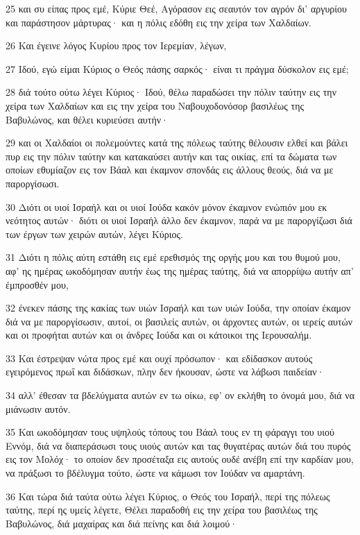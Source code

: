 \par 25 και συ είπας προς εμέ, Κύριε Θεέ, Αγόρασον εις σεαυτόν τον αγρόν δι' αργυρίου και παράστησον μάρτυρας· και η πόλις εδόθη εις την χείρα των Χαλδαίων.
\par 26 Και έγεινε λόγος Κυρίου προς τον Ιερεμίαν, λέγων,
\par 27 Ιδού, εγώ είμαι Κύριος ο Θεός πάσης σαρκός· είναι τι πράγμα δύσκολον εις εμέ;
\par 28 διά τούτο ούτω λέγει Κύριος· Ιδού, θέλω παραδώσει την πόλιν ταύτην εις την χείρα των Χαλδαίων και εις την χείρα του Ναβουχοδονόσορ βασιλέως της Βαβυλώνος, και θέλει κυριεύσει αυτήν·
\par 29 και οι Χαλδαίοι οι πολεμούντες κατά της πόλεως ταύτης θέλουσιν ελθεί και βάλει πυρ εις την πόλιν ταύτην και κατακαύσει αυτήν και τας οικίας, επί τα δώματα των οποίων εθυμίαζον εις τον Βάαλ και έκαμνον σπονδάς εις άλλους θεούς, διά να με παροργίσωσι.
\par 30 Διότι οι υιοί Ισραήλ και οι υιοί Ιούδα κακόν μόνον έκαμνον ενώπιόν μου εκ νεότητος αυτών· διότι οι υιοί Ισραήλ άλλο δεν έκαμνον, παρά να με παροργίζωσι διά των έργων των χειρών αυτών, λέγει Κύριος.
\par 31 Διότι η πόλις αύτη εστάθη εις εμέ ερεθισμός της οργής μου και του θυμού μου, αφ' ης ημέρας ωκοδόμησαν αυτήν έως της ημέρας ταύτης, διά να απορρίψω αυτήν απ' έμπροσθέν μου,
\par 32 ένεκεν πάσης της κακίας των υιών Ισραήλ και των υιών Ιούδα, την οποίαν έκαμον διά να με παροργίσωσιν, αυτοί, οι βασιλείς αυτών, οι άρχοντες αυτών, οι ιερείς αυτών και οι προφήται αυτών και οι άνδρες Ιούδα και οι κάτοικοι της Ιερουσαλήμ.
\par 33 Και έστρεψαν νώτα προς εμέ και ουχί πρόσωπον· και εδίδασκον αυτούς εγειρόμενος πρωΐ και διδάσκων, πλην δεν ήκουσαν, ώστε να λάβωσι παιδείαν·
\par 34 αλλ' έθεσαν τα βδελύγματα αυτών εν τω οίκω, εφ' ον εκλήθη το όνομά μου, διά να μιάνωσιν αυτόν.
\par 35 Και ωκοδόμησαν τους υψηλούς τόπους του Βάαλ τους εν τη φάραγγι του υιού Εννόμ, διά να διαπεράσωσι τους υιούς αυτών και τας θυγατέρας αυτών διά του πυρός εις τον Μολόχ· το οποίον δεν προσέταξα εις αυτούς ουδέ ανέβη επί την καρδίαν μου, να πράξωσι το βδέλυγμα τούτο, ώστε να κάμωσι τον Ιούδαν να αμαρτάνη.
\par 36 Και τώρα διά ταύτα ούτω λέγει Κύριος, ο Θεός του Ισραήλ, περί της πόλεως ταύτης, περί ης υμείς λέγετε, Θέλει παραδοθή εις την χείρα του βασιλέως της Βαβυλώνος, διά μαχαίρας και διά πείνης και διά λοιμού·
